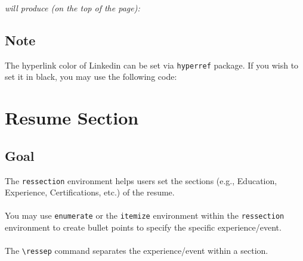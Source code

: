 \documentclass[a4paper,10pt]{article}
\begin{document}
\vspace{1cm}

{\it will produce (on the top of the page):}

\vspace{1cm}

\begin{tcolorbox}[standard jigsaw,opacityback=0.1,colback=gray,boxrule=0.5pt]
\end{tcolorbox}

\vspace{1cm}

\subsection{Note}
The hyperlink color of Linkedin can be set via {\tt hyperref} package. If you wish to set it in black, you may use the following code:

\begin{codebox}[title=Color of Hyperlink]
\usepackage[hidelinks]{hyperref}
\end{codebox}

\newpage

\section{Resume Section}

\subsection{Goal}
The \verb+ressection+ environment helps users set the sections (e.g., Education, Experience, Certifications, etc.) of the resume.\\
~\\
You may use {\tt enumerate} or the {\tt itemize} environment within the {\tt ressection} environment to create bullet points to specify the specific experience/event.\\
~\\
The \verb+\ressep+ command separates the experience/event within a section.

\newpage
\end{document}
